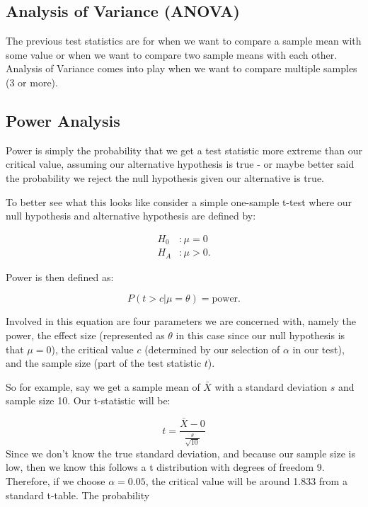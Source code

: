 \subsection{Analysis of Variance (ANOVA)}

The previous test statistics are for when we want to compare a sample mean with some value or when we want to compare two sample means with each other. Analysis of Variance comes into play when we want to compare multiple samples (3 or more). 



\subsection{Power Analysis}

Power is simply the probability that we get a test statistic more extreme than our critical value, assuming our alternative hypothesis is true - or maybe better said the probability we reject the null hypothesis given our alternative is true. 

To better see what this looks like consider a simple one-sample t-test where our null hypothesis and alternative hypothesis are defined by:

\begin{equation}
\begin{split}
H_0 &: \mu = 0 \\
H_A &:  \mu > 0.
\end{split}
\end{equation}

\noindent Power is then defined as:

\begin{equation}
P(t > c | \mu = \theta) = \text{power}.
\end{equation}

Involved in this equation are four parameters we are concerned with, namely the power, the effect size (represented as $\theta$ in this case since our null hypothesis is that $\mu=0$), the critical value $c$ (determined by our selection of $\alpha$ in our test), and the sample size (part of the test statistic $t$). 

So for example, say we get a sample mean of $\bar{X}$ with a standard deviation $s$ and sample size 10. Our t-statistic will be:

\begin{equation}
t = \frac{\bar{X} - 0}{\frac{s}{\sqrt{10}}}
\end{equation}
\noindent Since we don't know the true standard deviation, and because our sample size is low, then we know this follows a t distribution with degrees of freedom 9. Therefore, if we choose $\alpha=0.05$, the critical value will be around 1.833 from a standard t-table. The probability 

